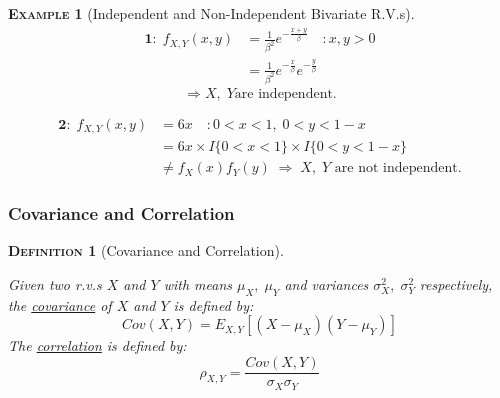 \documentclass[12pt,a4paper]{article}
\newtheorem{definition}{\textsc{Definition}}[section]
\newtheorem{example}{\textsc{Example}}[section]
\begin{document}
\begin{example}[Independent and Non-Independent Bivariate R.V.s]

\begin{align*}
\mathbf{1\!: }\; f_{X,Y}(x,y) &= \frac{1}{\beta^2}e^{-\frac{x+y}{\beta}}\quad : x,y>0\\
&= \frac{1}{\beta^2}e^{-\frac{x}{\beta}}e^{-\frac{y}{\beta}}
\end{align*}
$$\Rightarrow X,\;Y \text{are independent.}$$

\begin{align*}
\mathbf{2\!: }\; f_{X,Y}(x,y) &= 6x\quad : 0<x<1,\; 0<y<1-x\\
&= 6x \times I\{0<x<1\} \times I\{0<y<1-x\}\\
&\neq f_X(x)f_Y(y)\; \Rightarrow\; X,\; Y \text{ are not independent.}
\end{align*}

\end{example}

\subsubsection{Covariance and Correlation}

\begin{definition}[Covariance and Correlation]$\;$\par\vspace{1cm}

Given two r.v.s $X$ and $Y$ with means $\mu_X,\; \mu_Y$ and variances $\sigma_X^2,\; \sigma_Y^2$ respectively, the \underline{covariance} of $X$ and $Y$ is defined by:
$$Cov(X,Y) = E_{X,Y}[(X-\mu_X)(Y-\mu_Y)]$$
The \underline{correlation} is defined by:
$$\rho_{X,Y} = \frac{Cov(X,Y)}{\sigma_X \sigma_Y}$$
\end{definition}
\end{document}
